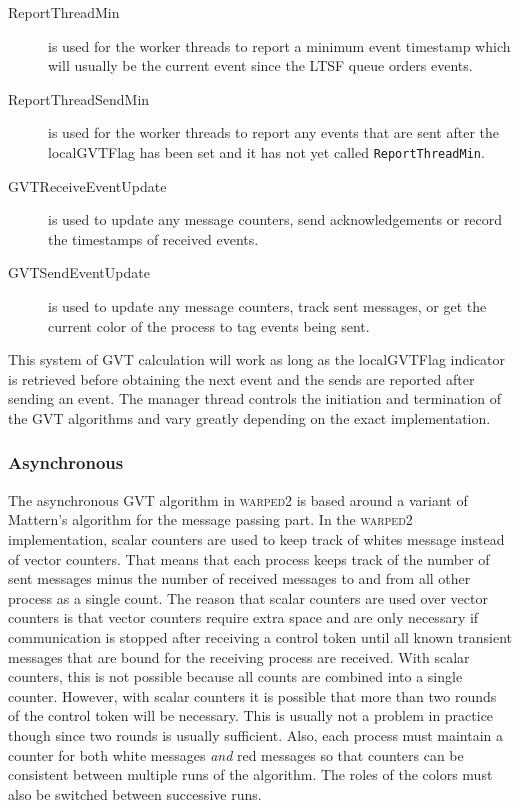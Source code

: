 \documentclass[11pt]{book}
\begin{document}
\begin{description}
    \item[ReportThreadMin ] is used for the worker threads to report a minimum event timestamp
        which will usually be the current event since the LTSF queue orders events.
    \item[ReportThreadSendMin ] is used for the worker threads to report any events that are sent
        after the localGVTFlag has been set and it has not yet called \texttt{ReportThreadMin}.
    \item[GVTReceiveEventUpdate ] is used to update any message counters, send acknowledgements or
        record the timestamps of received events.  
    \item[GVTSendEventUpdate ] is used to update any message counters, track sent messages, or get
        the current color of the process to tag events being sent.
\end{description}

This system of GVT calculation will work as long as the localGVTFlag indicator is retrieved before
obtaining the next event and the sends are reported after sending an event.  The manager thread
controls the initiation and termination of the GVT algorithms and vary greatly depending on
the exact implementation.

\subsubsection{Asynchronous}

The asynchronous GVT algorithm in \textsc{warped2} is based around a variant of Mattern's
algorithm for the message passing part.  In the \textsc{warped2} implementation, scalar counters
are used to keep track of whites message instead of vector counters.  That means that
each process keeps track of the number of sent messages minus the number of received messages
to and from all other process as a single count.  The reason that scalar counters are used over
vector counters is that vector counters require extra space and are only necessary if communication
is stopped after receiving a control token until all known transient messages that are bound for
the receiving process are received.  With scalar counters, this is not possible because all counts
are combined into a single counter.  However, with scalar counters it is possible that more than
two rounds of the control token will be necessary.  This is usually not a problem in practice
though since two rounds is usually sufficient.  Also, each process must maintain a counter for
both white messages \emph{and} red messages so that counters can be consistent between multiple
runs of the algorithm.  The roles of the colors must also be switched between successive runs.
\end{document}
